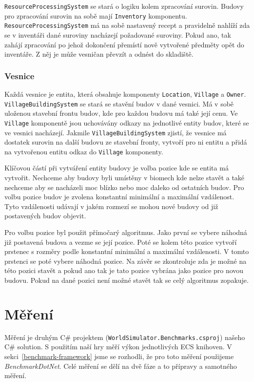 \texttt{ResourceProcessingSystem} se stará o logiku kolem zpracování surovin. Budovy pro zpracování surovin na sobě mají \texttt{Inventory} komponentu. \texttt{ResourceProcessingSystem} má na sobě nastavený recept a pravidelně nahlíží zda se v inventáři dané suroviny nacházejí požadované suroviny. Pokud ano, tak zahájí zpracování po jehož dokončení přemístí nově vytvořené předměty opět do inventáře. Z něj je může vesničan převzít a odnést do skladiště.

\subsubsection{Vesnice}
Každá vesnice je entita, která obsahuje komponenty \texttt{Location}, \texttt{Village} a \texttt{Owner}. \texttt{VillageBuildingSystem} se stará se stavění budov v dané vesnici. Má v sobě uloženou stavební frontu budov, kde pro každou budovu má také její cenu. Ve \texttt{Village} komponentě jsou uchovávány odkazy na jednotlivé entity budov, které se ve vesnici nacházejí. Jakmile \texttt{VillageBuildingSystem} zjistí, že vesnice má dostatek surovin na další budovu ze stavební fronty, vytvoří pro ni entitu a přidá na vytvořenou entitu odkaz do \texttt{Village} komponenty.

Klíčovou částí při vytváření entity budovy je volba pozice kde se entita má vytvořit. Nechceme aby budovy byli umístěny v biomech kde nelze stavět a také nechceme aby se nacházeli moc blízko nebo moc daleko od ostatních budov. Pro volbu pozice budov je zvolena konstantní minimální a maximální vzdálenost. Tyto vzdálenosti udávají v jakém rozmezí se mohou nové budovy od již postavených budov objevit.

Pro volbu pozice byl použit přímočarý algoritmus. Jako první se vybere náhodná již postavená budova a vezme se její pozice. Poté se kolem této pozice vytvoří prstenec s rozměry podle konstantní minimální a maximální vzdálenosti. V tomto prstenci se poté vybere náhodná pozice. Na závěr se zkontroluje zda je možné na této pozici stavět a pokud ano tak je tato pozice vybrána jako pozice pro novou budovu. Pokud na dané pozici není možné stavět tak se celý algoritmus zopakuje.

\section{Měření}
\label{benchmark-implementation}
Měření je druhým C\# projektem (\texttt{WorldSimulator.Benchmarks.csproj}) našeho C\# solution. S použitím naší hry měří výkon jednotlivých ECS knihoven. V sekci~\ref{benchmark-framework} jsme se rozhodli, že pro toto měření použijeme \textit{BenchmarkDotNet}. Celé měření se dělí na dvě fáze a to přípravy a samotného měření.

